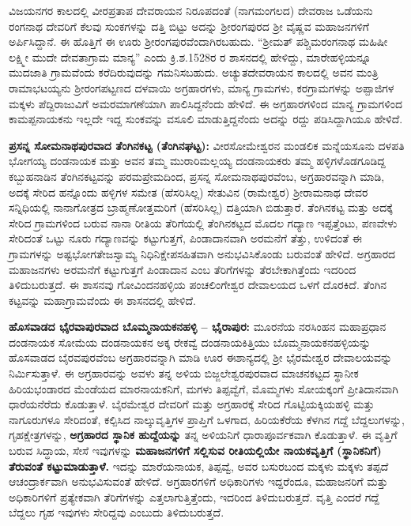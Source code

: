 ವಿಜಯನಗರ ಕಾಲದಲ್ಲಿ ವೀರಪ್ರತಾಪ ದೇವರಾಯನ ನಿರೂಪದಂತೆ (ನಾಗಮಂಗಲದ) ದೇವರಾಜ ಒಡೆಯನು ರಂಗನಾಥ ದೇವರಿಗೆ ಕೆಲವು ಸುಂಕಗಳನ್ನು ದತ್ತಿ ಬಿಟ್ಟು ಅದನ್ನು ಶ‍್ರೀರಂಗಪುರದ ಶ‍್ರೀ ವೈಷ್ಣವ ಮಹಾಜನಗಳಿಗೆ ಅರ್ಪಿಸಿದ್ದಾನೆ. ಈ ಹೊತ್ತಿಗೆ ಈ ಊರು ಶ‍್ರೀರಂಗಪುರವೆಂದಾಗಿರಬಹುದು. “ಶ‍್ರೀಮತ್​ ಪಶ್ಚಿಮರಂಗನಾಥ ಮಹಿಷೀ ಲಕ್ಷ್ಮೀ ಮುದೇ ದೇವತಾಗ್ರಾಮ ಮಾನ್ಯ” ಎಂದು ಕ್ರಿ.ಶ.1528ರ ರ ಶಾಸನದಲ್ಲಿ ಹೇಳಿದ್ದು, ಮಾರೇಹಳ್ಳಿಯನ್ನೂ ಮುದಜಾತಿ ಗ್ರಾಮವೆಂದು ಕರೆದಿರುವುದನ್ನು ಗಮನಿಸಬಹುದು. ಅಚ್ಯುತದೇವರಾಯನ ಕಾಲದಲ್ಲಿ ಅವನ ಮಂತ್ರಿ ರಾಮಾಭಟಯ್ಯನು ಶ‍್ರೀರಂಗಪಟ್ಟಣದ ದಳವಾಯಿ ಅಗ್ರಹಾರಗಳು, ಮಾನ್ಯ ಗ್ರಾಮಗಳು, ಕರಗ್ರಾಮಗಳನ್ನು ಅಪ್ಪಾಜಿಗಳ ಮಕ್ಕಳು ಪೆದ್ದಿರಾಜುವಿಗೆ ಅಮರಮಾಗಣೆಯಾಗಿ ಪಾಲಿಸಿದ್ದನೆಂದು ಹೇಳಿದೆ. ಈ ಅಗ್ರಹಾರಗಳಿಂದ ಮಾನ್ಯ ಗ್ರಾಮಗಳಿಂದ ಕಾಮಪ್ಪನಾಯಕನು ಇಲ್ಲದೇ ಇದ್ದ ಸುಂಕವನ್ನು ವಸೂಲಿ ಮಾಡುತ್ತಿದ್ದನೆಂದು ಅದನ್ನು ರದ್ದು ಪಡಿಸಿದ್ದಾಗಿಯೂ ಹೇಳಿದೆ.

\textbf{ಪ್ರಸನ್ನ ಸೋಮನಾಥಪುರವಾದ ತೆಂಗಿನಕಟ್ಟ (ತೆಂಗಿನಘಟ್ಟ):} ವೀರಸೋಮೇಶ್ವರನ ಮಂಡಲಿಕ ಮನ್ನೆಯಸೂನು ದಳಪತಿ ಭೋಗಯ್ಯ ದಂಡನಾಯಕ ಮತ್ತು ಅವನ ತಮ್ಮ ಮುರಾರಿಮಲ್ಲಯ್ಯ ದಂಡನಾಯಕರು ತಮ್ಮ ಹಳ್ಳಿಗಳೊಡಗೂಡಿದ್ದ ಕಬ್ಬುಹನಾಡಿನ ತೆಂಗಿನಕಟ್ಟವನ್ನು ಪರಮಪ್ರೇಮದಿಂದ, ಪ್ರಸನ್ನ ಸೋಮನಾಥಪುರವೆಂಬ, ಅಗ್ರಹಾರವನ್ನಾಗಿ ಮಾಡಿ, ಅದಕ್ಕೆ ಸೇರಿದ ಹನ್ನೊಂದು ಹಳ್ಳಿಗಳ ಸಮೇತ (ಹೆಸರಿಸಿಲ್ಲ) ಸೇತುವಿನ (ರಾಮೇಶ್ವರ) ಶ‍್ರೀರಾಮನಾಥ ದೇವರ ಸನ್ನಿಧಿಯಲ್ಲಿ ನಾನಾಗೋತ್ರದ ಬ್ರಾಹ್ಮಣೋತ್ತಮರಿಗೆ (ಹೆಸರಿಸಿಲ್ಲ) ದತ್ತಿಯಾಗಿ ಬಿಡುತ್ತಾರೆ. ತೆಂಗಿನಕಟ್ಟ ಮತ್ತು ಅದಕ್ಕೆ ಸೇರಿದ ಗ್ರಾಮಗಳಿಂದ ಬರುವ ನಾನಾ ರೀತಿಯ ತೆರಿಗೆಯಲ್ಲಿ ತೆಂಗಿನಕಟ್ಟದ ಮೊದಲ ಗದ್ಯಾಣ ಇಪ್ಪತ್ತೆಂಟು, ಪಣವೇಳು ಸೇರಿದಂತೆ ಒಟ್ಟು ನೂರು ಗದ್ಯಾಣವನ್ನು ಕಟ್ಟುಗುತ್ತಗೆ, ಪಿಂಡಾದಾನವಾಗಿ ಅರಮನೆಗೆ ತೆತ್ತು, ಉಳಿದಂತೆ ಈ ಗ್ರಾಮಗಳನ್ನು ಅಷ್ಟಭೋಗತೇಜಸ್ವಾಮ್ಯ ನಿಧಿನಿಕ್ಷೇಪಸಹಿತವಾಗಿ ಅನುಭವಿಸಿಕೊಂಡು ಬರುವಂತೆ ಹೇಳಿದೆ. ಅಗ್ರಹಾರದ ಮಹಾಜನಗಳು ಅರಮನೆಗೆ ಕಟ್ಟುಗುತ್ತಗೆ ಪಿಂಡಾದಾನ ಎಂಬ ತೆರಿಗೆಗಳನ್ನು ತೆರಬೇಕಾಗಿತ್ತೆಂದು ಇದರಿಂದ ತಿಳಿದುಬರುತ್ತದೆ. ಈ ಶಾಸನವು ಗೋವಿಂದನಹಳ್ಳಿಯ ಪಂಚಲಿಂಗೇಶ್ವರ ದೇವಾಲಯದ ಒಳಗೆ ದೊರಕಿದೆ. ತೆಂಗಿನ ಕಟ್ಟವನ್ನು ಮಹಾಗ್ರಾಮವೆಂದು ಈ ಶಾಸನದಲ್ಲಿ ಹೇಳಿದೆ. 

\textbf{ಹೊಸವಾಡದ ಭೈರವಾಪುರವಾದ ಬೊಮ್ಮನಾಯಕನಹಳ್ಳಿ – ಭೈರಾಪುರ:} ಮೂರನೆಯ ನರಸಿಂಹನ ಮಹಾಪ್ರಧಾನ ದಂಡನಾಯಕ ಸೋಮೆಯ ದಂಡನಾಯಕನ ಅಕ್ಕ ರೇಕವ್ವೆ ದಂಡನಾಯಕಿತ್ತಿಯು ಬೊಮ್ಮನಾಯಕನಹಳ್ಳಿಯನ್ನು ಹೊಸವಾಡದ ಬೈರವಪುರವೆಂಬ ಅಗ್ರಹಾರವನ್ನಾಗಿ ಮಾಡಿ ಊರ ಈಶಾನ್ಯದಲ್ಲಿ ಶ‍್ರೀ ಭೈರಮೇಶ್ವರ ದೇವಾಲಯವನ್ನು ನಿರ್ಮಿಸುತ್ತಾಳೆ. ಈ ಅಗ್ರಹಾರವನ್ನು ಅವಳು ತನ್ನ ಅಳಿಯ ಬಿಜ್ಜಲೇಶ್ವರಪುರವಾದ ಮಾಚನಕಟ್ಟದ ಸ್ಥಾನೀಕ ಹಿರಿಯಭಂಡಾರದ ಮೆಂಡೆಯದ ಮಾರನಾಯಕನಿಗೆ, ಮಗಳು ತಿಪ್ಪವ್ವೆಗೆ, ಮೊಮ್ಮಗಳು ಸೋಯಕ್ಕಂಗೆ ಪ್ರೀತಿದಾನವಾಗಿ ಧಾರೆಯನೆರೆದು ಕೊಡುತ್ತಾಳೆ. ಬೈರಮೇಶ್ವರ ದೇವರಿಗೆ ಮತ್ತು ಅಗ್ರಹಾರಕ್ಕೆ ಸೇರಿದ ಗೊಟ್ಟಿಯಕ್ಕಿಯಹಳ್ಳಿ ಮತ್ತು ನಾಗೂರುಗಳೂ ಸೇರಿದಂತೆ, ಕಲ್ಪಿಸಿದ ನಾಲ್ಕುವೃತ್ತಿಗಳ ಪ್ರಾಪ್ತಿಗೆ ಒಳಗಾದ, ಹಿರಿಯಕೆರೆಯ ಕೆಳಗಿನ ಗದ್ದೆ ಬೆದ್ದಲುಗಳನ್ನು, ಗೃಹಕ್ಷೇತ್ರಗಳನ್ನು, \textbf{ಅಗ್ರಹಾರದ ಸ್ಥಾನಿಕ ಹುದ್ದೆಯನ್ನು} ತನ್ನ ಅಳಿಯನಿಗೆ ಧಾರಾಪೂರ್ವಕವಾಗಿ ಕೊಡುತ್ತಾಳೆ. ಈ ವೃತ್ತಿಗೆ ಬರುವ ಸಿದ್ಧಾಯ, ಸೇಸೆ ಇವುಗಳನ್ನು \textbf{ಮಹಾಜನಗಳಿಗೆ ಸಲ್ಲಿಸುವ ರೀತಿಯಲ್ಲಿಯೇ ನಾಯಕವೃತ್ತಿಗೆ (ಸ್ಥಾನಿಕನಿಗೆ) ತೆರುವಂತೆ ಕಟ್ಟುಮಾಡುತ್ತಾಳೆ.} ಇದನ್ನು ಮಾರೆಯನಾಯಕ, ತಿಪ್ಪವ್ವೆ, ಅವರ ಬಸುರಬಂದ ಮಕ್ಕಳು ಮಕ್ಕಳು ತಪ್ಪದೆ ಆಚಂದ್ರಾರ್ಕವಾಗಿ ಅನುಭವಿಸುವಂತೆ ಹೇಳಿದೆ. ಅಗ್ರಹಾರಗಳಿಗೆ ಅಧಿಕಾರಿಗಳು ಇದ್ದರೆಂದೂ, ಮಹಾಜನರಿಗೆ ಮತ್ತು ಅಧಿಕಾರಿಗಳಿಗೆ ಪ್ರತ್ಯೇಕವಾಗಿ ತೆರಿಗೆಗಳನ್ನು ಎತ್ತಲಾಗುತ್ತಿತ್ತೆಂದು, ಇದರಿಂದ ತಿಳಿದುಬರುತ್ತದೆ. ವೃತ್ತಿ ಎಂದರೆ ಗದ್ದೆ ಬೆದ್ದಲು ಗೃಹ ಇವುಗಳು ಸೇರಿದ್ದವು ಎಂಬುದು ತಿಳಿದುಬರುತ್ತದೆ. 

